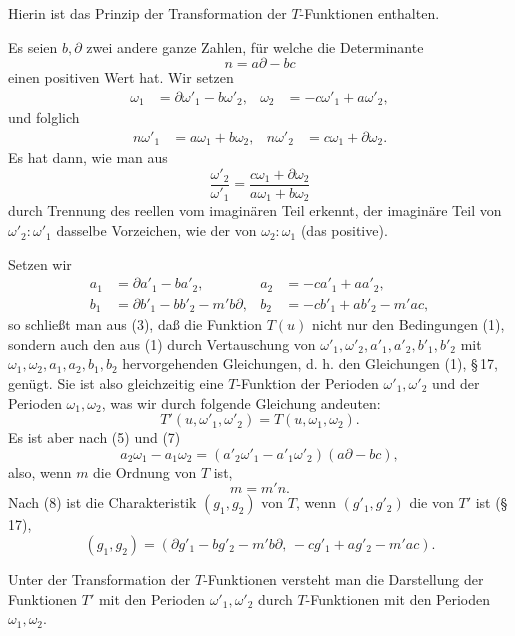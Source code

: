 \documentclass[11pt]{article}
\begin{document}
Hierin ist das Prinzip der Transformation der $T$-Funktionen enthalten.

Es seien $b,\partial$ zwei andere ganze Zahlen, für welche die Determinante
\begin{equation}
n=a\partial-bc \tag{4}
\end{equation}
einen positiven Wert hat. Wir setzen
\begin{align}
\omega_1&=\partial\omega'_1-b\omega'_2,&
\omega_2&=-c\omega'_1+a\omega'_2, \tag{5}
\end{align}
und folglich
\begin{align}
n\omega'_1&=a\omega_1+b\omega_2,&
n\omega'_2&=c\omega_1+\partial\omega_2. \tag{6}
\end{align}
Es hat dann, wie man aus
\[
\frac{\omega'_2}{\omega'_1}=\frac{c\omega_1+\partial\omega_2}{a\omega_1+b\omega_2}
\]
durch Trennung des reellen vom imaginären Teil erkennt, der imaginäre Teil von $\omega'_2:\omega'_1$ dasselbe Vorzeichen, wie der von $\omega_2:\omega_1$ (das positive).

Setzen wir
\begin{align}
a_1&=\partial a'_1-ba'_2,& a_2&=-ca'_1+aa'_2, \tag{7}\\
b_1&=\partial b'_1-bb'_2-m'b\partial,& b_2&=-cb'_1+ab'_2-m'ac, \tag{8}
\end{align}
so schließt man aus (3), daß die Funktion $T(u)$ nicht nur den Bedingungen (1), sondern auch den aus (1) durch Vertauschung von $\omega'_1,\omega'_2,a'_1,a'_2,b'_1,b'_2$ mit $\omega_1,\omega_2,a_1,a_2,b_1,b_2$ hervorgehenden Gleichungen, d. h. den Gleichungen (1), \S\,17, genügt. Sie ist also gleichzeitig eine $T$-Funktion der Perioden $\omega'_1,\omega'_2$ und der Perioden $\omega_1,\omega_2$, was wir durch folgende Gleichung andeuten:
\begin{equation}
T'(u,\omega'_1,\omega'_2)=T(u,\omega_1,\omega_2). \tag{9}
\end{equation}
Es ist aber nach (5) und (7)
\[
a_2\omega_1-a_1\omega_2=(a'_2\omega'_1-a'_1\omega'_2)(a\partial-bc),
\]
also, wenn $m$ die Ordnung von $T$ ist,
\begin{equation}
m=m'n. \tag{10}
\end{equation}
Nach (8) ist die Charakteristik $(g_1,g_2)$ von $T$, wenn $(g'_1,g'_2)$ die von $T'$ ist (\S\,17),
\begin{equation}
(g_1,g_2)=(\partial g'_1-bg'_2-m'b\partial,\,-cg'_1+ag'_2-m'ac). \tag{11}
\end{equation}

Unter der Transformation der $T$-Funktionen versteht man die Darstellung der Funktionen $T'$ mit den Perioden $\omega'_1,\omega'_2$ durch $T$-Funktionen mit den Perioden $\omega_1,\omega_2$.
\end{document}
